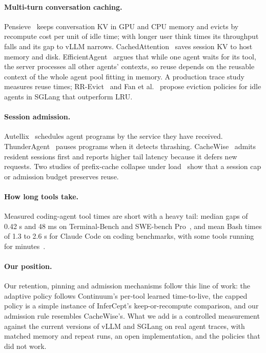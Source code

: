 \documentclass[11pt]{article}
\begin{document}
\paragraph{Multi-turn conversation caching.} Pensieve~\cite{pensieve} keeps conversation KV in GPU and CPU memory and evicts by recompute cost per unit of idle time; with longer user think times its throughput falls and its gap to vLLM narrows. CachedAttention~\cite{cachedattention} saves session KV to host memory and disk. EfficientAgent~\cite{efficientagent} argues that while one agent waits for its tool, the server processes all other agents' contexts, so reuse depends on the reusable context of the whole agent pool fitting in memory. A production trace study~\cite{kvcachewild} measures reuse times; RR-Evict~\cite{rrevict} and Fan et al.~\cite{penelope} propose eviction policies for idle agents in SGLang that outperform LRU.

\paragraph{Session admission.} Autellix~\cite{autellix} schedules agent programs by the service they have received. ThunderAgent~\cite{thunderagent} pauses programs when it detects thrashing. CacheWise~\cite{cachewise} admits resident sessions first and reports higher tail latency because it defers new requests. Two studies of prefix-cache collapse under load~\cite{cachetrap,insidetrap} show that a session cap or admission budget preserves reuse.

\paragraph{How long tools take.} Measured coding-agent tool times are short with a heavy tail: median gaps of 0.42 s and 48 ms on Terminal-Bench and SWE-bench Pro~\cite{cachetrap}, and mean Bash times of 1.3 to 2.6 s for Claude Code on coding benchmarks, with some tools running for minutes~\cite{workloadchar}.

\paragraph{Our position.} Our retention, pinning and admission mechanisms follow this line of work: the adaptive policy follows Continuum's per-tool learned time-to-live, the capped policy is a simple instance of InferCept's keep-or-recompute comparison, and our admission rule resembles CacheWise's. What we add is a controlled measurement against the current versions of vLLM and SGLang on real agent traces, with matched memory and repeat runs, an open implementation, and the policies that did not work.
\end{document}
